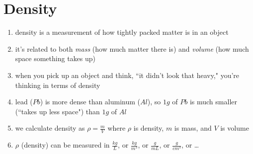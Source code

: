\documentclass[11pt, oneside]{article}   	%
\begin{document}
\begin{enumerate}[label=Example \arabic*]
\end{enumerate}

\section{Density}
\begin{enumerate}
\item density is a measurement of how tightly packed matter is in an object
\item it's related to both \emph{mass} (how much matter there is) and \emph{volume} (how much space something takes up)
\item when you pick up an object and think, ``it didn't look that heavy," you're thinking in terms of density
\item lead ($Pb$) is more dense than aluminum ($Al$), so $1 g$ of $Pb$ is much smaller (``takes up less space") than $1 g$ of $Al$
\item we calculate density as $ \rho = \frac{m}{V} $ where $\rho$ is density, $m$ is mass, and $V$ is volume
\item $ \rho $ (density) can be measured in $\frac{kg}{L}$, or $\frac{kg}{m^{3}}$, or $\frac{g}{mL}$, or $\frac{g}{cm^{3}}$, or \ldots
\end{enumerate}
\end{document}
